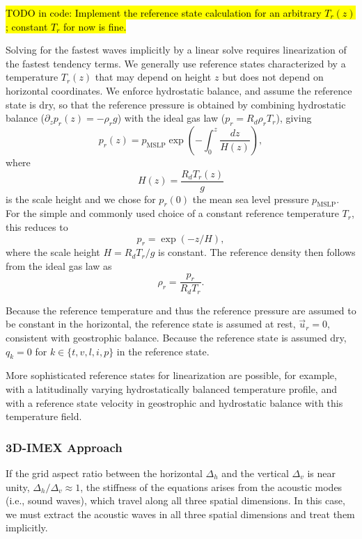 \documentclass{article}
\begin{document}
{\hl{TODO in code: Implement the reference state calculation for an arbitrary $T_r(z)$; constant $T_r$ for now is fine.}

Solving for the fastest waves implicitly by a linear solve requires linearization of the fastest tendency terms. We generally use reference states characterized by a temperature $T_r(z)$ that may depend on height $z$ but does not depend on horizontal coordinates. We enforce hydrostatic balance, and assume the reference state is dry, so that the reference pressure is obtained by combining hydrostatic balance ($\partial_z p_r(z) = - \rho_r g$) with the ideal gas law ($p_r=R_d \rho_r T_r$), giving 
\[
p_r(z) = p_{\mathrm{MSLP}} \exp\left(-\int_0^z \frac{dz}{H(z)} \right),
\]
where
\[
H(z)  = \frac{R_d T_r(z)}{g}
\]
is the scale height and we chose for $p_r(0)$ the mean sea level pressure $p_{\mathrm{MSLP}}$. For the simple and commonly used choice of a constant reference temperature $T_r$, this reduces to
\begin{equation}
    p_r = \exp (-z/H),
\end{equation}
where the scale height $H = R_d T_{r}/g$ is constant. The reference density then follows from the ideal gas law as
\begin{equation}
    \rho_r = \frac{p_r}{R_d T_{r}}.
\end{equation}

Because the reference temperature and thus the reference pressure are assumed to be constant in the horizontal, the reference state is assumed at rest, $\vec{u}_r = 0$, consistent with geostrophic balance. Because the reference state is assumed dry, $q_k= 0$ for $k \in \{ t, v, l, i, p\}$ in the reference state.

More sophisticated reference states for linearization are possible, for example, with a latitudinally varying hydrostatically balanced temperature profile, and with a reference state velocity in geostrophic and hydrostatic balance with this temperature field. 
 
 \subsubsection{3D-IMEX Approach}
 \label{sec:3D-IMEX/v1}
If the grid aspect ratio between the horizontal $\Delta_h$ and the vertical $\Delta_v$ is near unity, $\Delta_h/\Delta_v \approx 1$, the stiffness of the equations arises from the acoustic modes (i.e., sound waves), which travel along all three spatial dimensions. In this case, we must extract the acoustic waves in all three spatial dimensions and treat them implicitly.  

}
\end{document}
